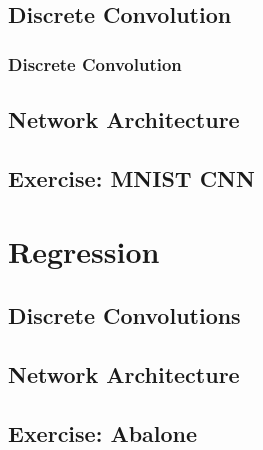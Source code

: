 \documentclass[aspectratio=169]{beamer}
\newcommand\imageright[1]{ %
    \caption*{\scalebox{.5}{\textcolor{lightgray}{\textcopyright~#1}}} %
}
\begin{document}
\subsection{Discrete Convolution}
\label{subsec:discrete-convolution}

\begin{frame}
    \frametitle{Discrete Convolution}
    \begin{figure}
        \centering
        \imageright{Machine Learning Guru}
    \end{figure}
\end{frame}

\subsection{Network Architecture}
\subsection{Exercise: MNIST CNN}

\section{Regression}

\subsection{Discrete Convolutions}
\subsection{Network Architecture}
\subsection{Exercise: Abalone}
\end{document}
